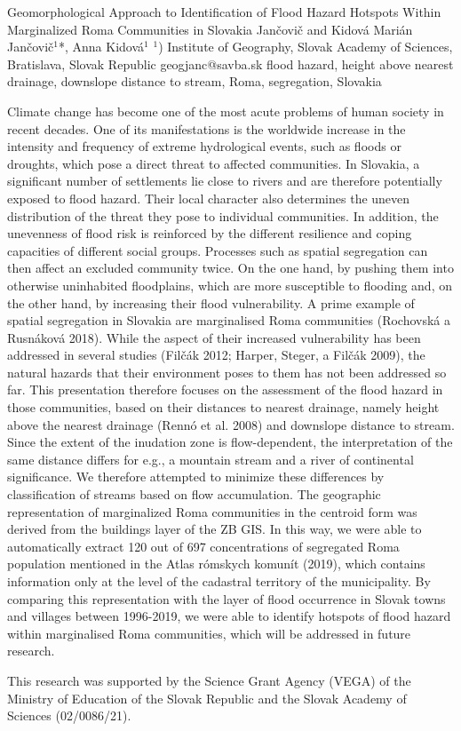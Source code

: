 \abstract
{Geomorphological Approach to Identification of Flood Hazard Hotspots Within Marginalized Roma Communities in Slovakia} %
{Jančovič and Kidová} %
{Marián Jančovič$^1$*, Anna Kidová$^1$} %
{\KLtag} %
{$^1$) Institute of Geography, Slovak Academy of Sciences, Bratislava, Slovak Republic
} %
{geogjanc@savba.sk}  %
{flood hazard, height above nearest drainage, downslope distance to stream, Roma, segregation, Slovakia}%
{Climate change has become one of the most acute problems of human society in recent decades. One of its manifestations is the worldwide increase in the intensity and frequency of extreme hydrological events, such as floods or droughts, which pose a direct threat to affected communities. In Slovakia, a significant number of settlements lie close to rivers and are therefore potentially exposed to flood hazard. Their local character also determines the uneven distribution of the threat they pose to individual communities. In addition, the unevenness of flood risk is reinforced by the different resilience and coping capacities of different social groups. Processes such as spatial segregation can then affect an excluded community twice. On the one hand, by pushing them into otherwise uninhabited floodplains, which are more susceptible to flooding and, on the other hand, by increasing their flood vulnerability. A prime example of spatial segregation in Slovakia are marginalised Roma communities (Rochovská a Rusnáková 2018). While the aspect of their increased vulnerability has been addressed in several studies (Filčák 2012; Harper, Steger, a Filčák 2009), the natural hazards that their environment poses to them has not been addressed so far. This presentation therefore focuses on the assessment of the flood hazard in those communities, based on their distances to nearest drainage, namely height above the nearest drainage (Rennó et al. 2008) and downslope distance to stream. Since the extent of the inudation zone is flow-dependent, the interpretation of the same distance differs for e.g., a mountain stream and a river of continental significance. We therefore attempted to minimize these differences by classification of streams based on flow accumulation. The geographic representation of marginalized Roma communities in the centroid form was derived from the buildings layer of the ZB GIS. In this way, we were able to automatically extract 120 out of 697 concentrations of segregated Roma population mentioned in the Atlas rómskych komunít (2019), which contains information only at the level of the cadastral territory of the municipality. By comparing this representation with the layer of flood occurrence in Slovak towns and villages between 1996-2019, we were able to identify hotspots of flood hazard within marginalised Roma communities, which will be addressed in future research.
	
This research was supported by the Science Grant Agency (VEGA) of the Ministry of Education of the Slovak Republic and the Slovak Academy of Sciences (02/0086/21).
}%
